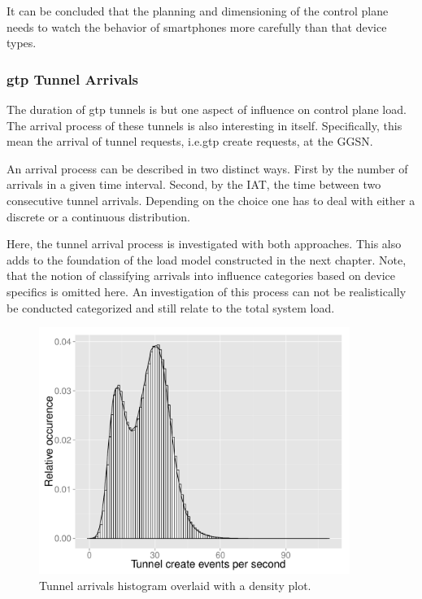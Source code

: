 It can be concluded that the planning and dimensioning of the control plane needs to watch the behavior of smartphones more carefully than that device types.

\subsubsection{\texorpdfstring{\acrshort{gtp}}{GTP} Tunnel Arrivals}

The duration of \gls{gtp} tunnels is but one aspect of influence on control plane load. The arrival process of these tunnels is also interesting in itself. Specifically, this mean the arrival of tunnel requests, i.e.\gls{gtp} create requests, at the \gls{GGSN}. 

An arrival process can be described in two distinct ways. First by the number of arrivals in a given time interval. Second, by the \gls{IAT}, the time between two consecutive tunnel arrivals. Depending on the choice one has to deal with either a discrete or a continuous distribution.

Here, the tunnel arrival process is investigated with both approaches. This also adds to the foundation of the load model constructed in the next chapter. Note, that the notion of classifying arrivals into influence categories based on device specifics is omitted here. An investigation of this process can not be realistically be conducted categorized and still relate to the total system load.

\begin{figure}[htb]
	\centering
	\includegraphics[width=0.9\textwidth]{images/create_freq.pdf}
	\caption{Tunnel arrivals histogram overlaid with a density plot.}
	\label{c4:fig:freq-arrivals}
\end{figure}

